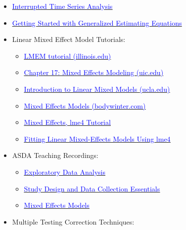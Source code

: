 \documentclass[
]{article}
\providecommand{\tightlist}{%
  \setlength{\itemsep}{0pt}\setlength{\parskip}{0pt}}
\begin{document}
\begin{itemize}
\tightlist
\item
  \href{https://rpubs.com/mbounthavong/MEPS_tutorial_6_itsa}{\underline{\textcolor{blue}{Interrupted Time Series Analysis}}}
\item
  \href{https://library.virginia.edu/data/articles/getting-started-with-generalized-estimating-equations\#:~:text=Generalized\%20estimating\%20equations\%2C\%20or\%20GEE,(i.e.\%2C\%20model\%20coefficients).}{\underline{\textcolor{blue}{Getting Started with Generalized Estimating Equations}}}
\item
  Linear Mixed Effect Model Tutorials:

  \begin{itemize}
  \tightlist
  \item
    \href{https://jontalle.web.engr.illinois.edu/MISC/lme4/bw_LME_tutorial.pdf}{\underline{\textcolor{blue}{LMEM tutorial (illinois.edu)}}}
  \item
    \href{https://ademos.people.uic.edu/Chapter17.html}{\underline{\textcolor{blue}{Chapter 17: Mixed Effects Modeling (uic.edu)}}}
  \item
    \href{https://stats.idre.ucla.edu/other/mult-pkg/introduction-to-linear-mixed-models/}{\underline{\textcolor{blue}{Introduction to Linear Mixed Models (ucla.edu)}}}
  \item
    \href{https://bodo-winter.net/tutorial/bw_LME_tutorial1.pdf}{\underline{\textcolor{blue}{Mixed Effects Models (bodywinter.com)}}}
  \item
    \href{https://ourcodingclub.github.io/tutorials/mixed-models/}{\underline{\textcolor{blue}{Mixed Effects, lme4 Tutorial}}}
  \item
    \href{https://cran.r-project.org/web/packages/lme4/vignettes/lmer.pdf}{\underline{\textcolor{blue}{Fitting Linear Mixed-Effects Models Using lme4}}}
  \end{itemize}
\item
  ASDA Teaching Recordings:

  \begin{itemize}
  \tightlist
  \item
    \href{https://community.grad.ubc.ca/gps/event/22318}{\underline{\textcolor{blue}{Exploratory Data Analysis}}}
  \item
    \href{https://community.grad.ubc.ca/gps/event/22327}{\underline{\textcolor{blue}{Study Design and Data Collection Essentials}}}
  \item
    \href{https://community.grad.ubc.ca/gps/event/22330}{\underline{\textcolor{blue}{Mixed Effects Models}}}
  \end{itemize}
\item
  Multiple Testing Correction Techniques:


\end{itemize}
\end{document}
